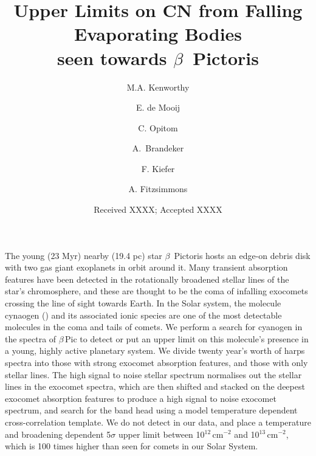 \documentclass{aa}
\newcommand{\bp}{$\beta$\,Pic}
\begin{document}
 


   \title{Upper Limits on CN from Falling Evaporating Bodies\\seen towards $\beta$~Pictoris}

   \author{M.A. Kenworthy
          \and
          E. de Mooij
          \and
          C. Opitom
          \and
          A.\ Brandeker
          \and 
          F. Kiefer
          \and
          A. Fitzsimmons 
          }


   \date{Received XXXX; Accepted XXXX}

 
  \abstract
   {The young (23 Myr) nearby (19.4 pc) star $\beta$~Pictoris hosts an edge-on debris disk with two gas giant exoplanets in orbit around it.
   Many transient absorption features have been detected in the rotationally broadened stellar lines of the star's chromosphere, and these are thought to be the coma of infalling exocomets crossing the line of sight towards Earth.
}
   {In the Solar system, the molecule cynaogen () and its associated ionic species are one of the most detectable molecules in the coma and tails of comets.
   We perform a search for cyanogen in the spectra of \bp{} to detect or put an upper limit on this molecule's presence in a young, highly active planetary system.}
   {We divide twenty year's worth of \ac{harps} spectra into those with strong exocomet absorption features, and those with only stellar lines.
   The high signal to noise stellar spectrum normalises out the stellar lines in the exocomet spectra, which are then shifted and stacked on the deepest exocomet absorption features to produce a high signal to noise exocomet spectrum, and search for the  band head using a model temperature dependent cross-correlation template.
   }
   {We do not detect  in our data, and place a temperature and broadening dependent 5$\sigma$ upper limit between 10$^{12}$\,cm$^{-2}$ and 10$^{13}$\,cm$^{-2}$, which is 100 times higher than seen for comets in our Solar System.%
   }
\end{document}
